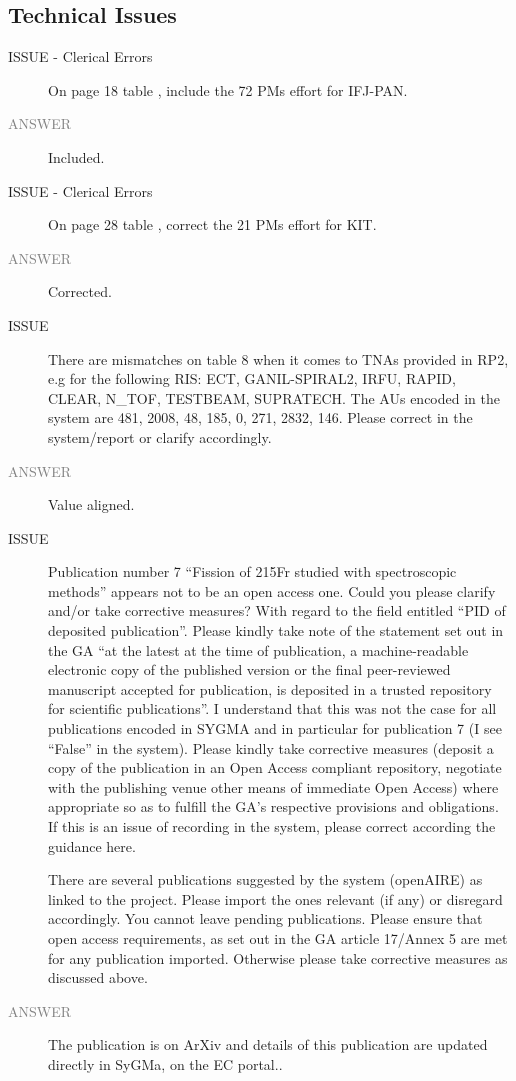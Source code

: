 \subsection*{Technical Issues}

\begin{prtwo}
\begin{description}
\item[ISSUE - Clerical Errors] On page 18 table , include the 72 PMs effort for IFJ-PAN. 
\item[\textcolor{gray}{ANSWER}] Included.

\item[ISSUE - Clerical Errors] On page 28 table , correct the 21 PMs effort for KIT.
\item[\textcolor{gray}{ANSWER}] Corrected. 

\item[ISSUE] There are mismatches on table 8 when it comes to TNAs provided in RP2, e.g for the following RIS:
ECT, GANIL-SPIRAL2, IRFU, RAPID, CLEAR, N\_TOF, TESTBEAM, SUPRATECH. The
AUs encoded in the system are 481, 2008, 48, 185, 0, 271, 2832, 146.
Please correct in the system/report or clarify accordingly.
\item[\textcolor{gray}{ANSWER}] Value aligned.

\item[ISSUE] Publication number 7 “Fission of 215Fr studied with spectroscopic methods” appears not to be an open access one. Could you please clarify and/or take corrective measures?
With regard to the field entitled “PID of deposited publication”. Please kindly take note of the statement set out in the GA “at the latest at the time of publication, a machine-readable electronic copy of the published version or the final peer-reviewed manuscript accepted for publication, is deposited in a trusted repository for scientific publications”.
I understand that this was not the case for all publications encoded in SYGMA and in particular for publication 7 (I see “False” in the system). Please kindly take corrective measures (deposit a copy of the publication in an Open Access compliant repository, negotiate with the publishing venue other means of immediate Open Access) where appropriate so as to fulfill the GA’s respective provisions and obligations. If this is an issue of recording in the system, please correct according the guidance here.

There are several publications suggested by the system (openAIRE) as linked to the project. Please import the ones relevant (if any) or disregard accordingly. You cannot leave pending publications. Please ensure that open access requirements, as set out in the GA article 17/Annex 5 are met for any publication imported. Otherwise please take corrective measures as discussed above.
\item[\textcolor{gray}{ANSWER}] The publication is
on ArXiv and details of this publication are updated directly in SyGMa, on the EC portal..


\end{description}
\end{prtwo}
